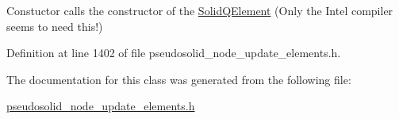 Constuctor calls the constructor of the \hyperlink{classoomph_1_1SolidQElement}{Solid\+Q\+Element} (Only the Intel compiler seems to need this!) 



Definition at line 1402 of file pseudosolid\+\_\+node\+\_\+update\+\_\+elements.\+h.



The documentation for this class was generated from the following file\+:\begin{DoxyCompactItemize}
\item 
\hyperlink{pseudosolid__node__update__elements_8h}{pseudosolid\+\_\+node\+\_\+update\+\_\+elements.\+h}\end{DoxyCompactItemize}

